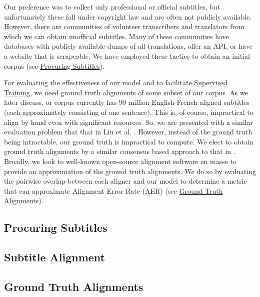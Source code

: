 \documentclass[twoside,twocolumn]{article}
\begin{document}
Our preference was to collect only professional or official subtitles, but
unfortunately these fall under copyright law and are often not publicly
available. However, there are communities of volunteer transcribers and
translators from which we can obtain unofficial subtitles. Many of these
communities have databases with publicly available dumps of all translations,
offer an API, or have a website that is scrapeable. We have employed these
tactics to obtain an initial corpus (see
\hyperref[subsec:procuring-subtitles]{Procuring Subtitles}).

For evaluating the effectiveness of our model and to facilitate
\hyperref[sec:supervised-training]{Supervised Training}, we need ground truth
alignments of some subset of our corpus. As we later discuss, or corpus
currently has 90 million English-French aligned subtitles (each approximately
consisting of one sentence). This is, of course, impractical to align by hand
even with significant resources. So, we are presented with a similar evaluation
problem that that in Liu et al. \cite{liu2015streaming}. However, instead of
the ground truth being intractable, our ground truth is impractical to compute.
We elect to obtain ground truth alignments by a similar consensus based
approach to that in \cite{liu2015streaming}. Broadly, we look to well-known
open-source alignment software en masse to provide an approximation of the
ground truth alignments. We do so by evaluating the pairwise overlap between
each aligner and our model to determine a metric that can approximate
Alignment Error Rate (AER) (see
\hyperref[subsec:ground-truth-alignments]{Ground Truth Alignments}).


\subsection{Procuring Subtitles}
\label{subsec:procuring-subtitles}



\subsection{Subtitle Alignment}
\label{subsec:subtitle-alignment}



\subsection{Ground Truth Alignments}
\label{subsec:ground-truth-alignments}
\end{document}
